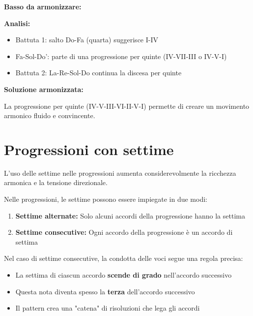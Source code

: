 \begin{esempio}
	\label{ex:basso_dato_progressione}
	
	\textbf{Basso da armonizzare:}
	
	\textbf{Analisi:}
	\begin{itemize}
		\item Battuta 1: salto Do-Fa (quarta) suggerisce I-IV
		\item Fa-Sol-Do': parte di una progressione per quinte (IV-VII-III o IV-V-I)
		\item Battuta 2: La-Re-Sol-Do continua la discesa per quinte
	\end{itemize}
	
	\textbf{Soluzione armonizzata:}
	
	La progressione per quinte (IV-V-III-VI-II-V-I) permette di creare un movimento armonico fluido e convincente.
\end{esempio}

\section{Progressioni con settime}
\label{sec:progressioni_settime}

L'uso delle settime nelle progressioni aumenta considerevolmente la ricchezza armonica e la tensione direzionale.

\begin{regola}
	\label{reg:progressioni_settime}
	Nelle progressioni, le settime possono essere impiegate in due modi:
	
	\begin{enumerate}
		\item \textbf{Settime alternate:} Solo alcuni accordi della progressione hanno la settima
		\item \textbf{Settime consecutive:} Ogni accordo della progressione è un accordo di settima
	\end{enumerate}
	
	Nel caso di settime consecutive, la condotta delle voci segue una regola precisa:
	\begin{itemize}
		\item La settima di ciascun accordo \textbf{scende di grado} nell'accordo successivo
		\item Questa nota diventa spesso la \textbf{terza} dell'accordo successivo
		\item Il pattern crea una "catena" di risoluzioni che lega gli accordi
	\end{itemize}
\end{regola}

